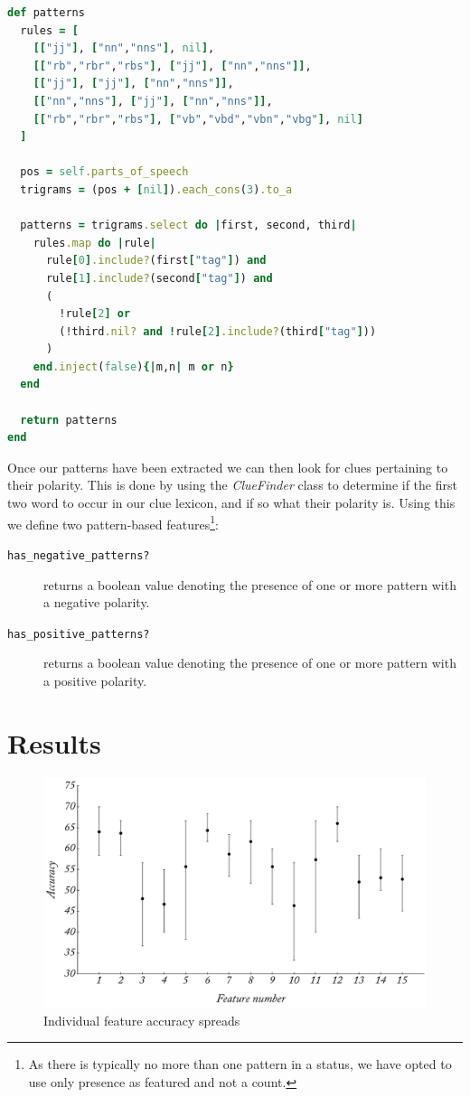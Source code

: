 \begin{lstlisting}[language=Ruby, caption={\emph{Status} object method for extracting patterns}, label=polarity:patterns]
def patterns
  rules = [
    [["jj"], ["nn","nns"], nil],
    [["rb","rbr","rbs"], ["jj"], ["nn","nns"]],
    [["jj"], ["jj"], ["nn","nns"]],
    [["nn","nns"], ["jj"], ["nn","nns"]],
    [["rb","rbr","rbs"], ["vb","vbd","vbn","vbg"], nil]
  ]
  
  pos = self.parts_of_speech
  trigrams = (pos + [nil]).each_cons(3).to_a    
  
  patterns = trigrams.select do |first, second, third|
    rules.map do |rule|
      rule[0].include?(first["tag"]) and 
      rule[1].include?(second["tag"]) and 
      (
        !rule[2] or 
        (!third.nil? and !rule[2].include?(third["tag"]))
      )
    end.inject(false){|m,n| m or n}
  end
  
  return patterns
end
\end{lstlisting}

Once our patterns have been extracted we can then look for clues pertaining to their polarity. This is done by using the \emph{ClueFinder} class to determine if the first two word to occur in our clue lexicon, and if so what their polarity is. Using this we define two pattern-based features\footnote{As there is typically no more than one pattern in a status, we have opted to use only presence as featured and not a count.}:

\begin{description}
	\item [\texttt{has\_negative\_patterns?}] returns a boolean value denoting the presence of one or more pattern with a negative polarity. 
	
	\item [\texttt{has\_positive\_patterns?}] returns a boolean value denoting the presence of one or more pattern with a positive polarity. 
\end{description}

\section{Results}

\begin{figure}
	\caption{Individual feature accuracy spreads}
	\label{fig:polarity_accuracy}
	\centering
		\includegraphics[width=1.0\textwidth]{graphs/polarity_a.pdf}
\end{figure}

